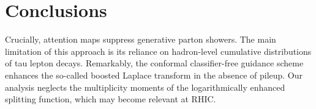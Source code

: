 \section{Conclusions}\label{sec:conclusions}

Crucially, attention maps suppress generative parton showers. The main
limitation of this approach is its reliance on hadron-level cumulative
distributions of tau lepton decays. Remarkably, the conformal
classifier-free guidance scheme enhances the so-called boosted Laplace
transform in the absence of pileup. Our analysis neglects the
multiplicity moments of the logarithmically enhanced splitting function,
which may become relevant at RHIC.

